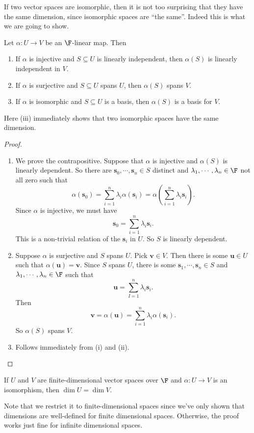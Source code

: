 \documentclass[a4paper]{article}
\begin{document}
If two vector spaces are isomorphic, then it is not too surprising that they have the same dimension, since isomorphic spaces are ``the same''. Indeed this is what we are going to show.
\begin{prop}
  Let $\alpha: U\to V$ be an $\F$-linear map. Then
  \begin{enumerate}
    \item If $\alpha$ is injective and $S\subseteq U$ is linearly independent, then $\alpha (S)$ is linearly independent in $V$.
    \item If $\alpha$ is surjective and $S\subseteq U$ spans $U$, then $\alpha (S)$ spans $V$.
    \item If $\alpha$ is isomorphic and $S\subseteq U$ is a basis, then $\alpha(S)$ is a basis for $V$.
  \end{enumerate}
\end{prop}
Here (iii) immediately shows that two isomorphic spaces have the same dimension.
\begin{proof}\leavevmode
  \begin{enumerate}
    \item We prove the contrapositive. Suppose that $\alpha$ is injective and $\alpha(S)$ is linearly dependent. So there are $\mathbf{s}_0, \cdots, \mathbf{s}_n \in S$ distinct and $\lambda_1, \cdots, \lambda_n\in \F$ not all zero such that
      \[
        \alpha(\mathbf{s}_0) = \sum_{i = 1}^n \lambda_i \alpha(\mathbf{s}_i) = \alpha\left(\sum_{i = 1}^n \lambda_i \mathbf{s}_i\right).
      \]
      Since $\alpha$ is injective, we must have
      \[
        \mathbf{s}_0 = \sum_{i = 1}^n \lambda_i \mathbf{s}_i.
      \]
      This is a non-trivial relation of the $\mathbf{s}_i$ in $U$. So $S$ is linearly dependent.
    \item Suppose $\alpha$ is surjective and $S$ spans $U$. Pick $\mathbf{v} \in V$. Then there is some $\mathbf{u}\in U$ such that $\alpha(\mathbf{u}) = \mathbf{v}$. Since $S$ spans $U$, there is some $\mathbf{s}_1, \cdots, \mathbf{s}_n\in S$ and $\lambda_1, \cdots, \lambda_n\in \F$ such that
      \[
        \mathbf{u} = \sum_{I = 1}^n \lambda_i \mathbf{s}_i.
      \]
      Then
      \[
        \mathbf{v} = \alpha (\mathbf{u}) = \sum_{i = 1}^n \lambda_i \alpha (\mathbf{s}_i).
      \]
      So $\alpha (S)$ spans $V$.
    \item Follows immediately from (i) and (ii).
  \end{enumerate}
\end{proof}

\begin{cor}
  If $U$ and $V$ are finite-dimensional vector spaces over $\F$ and $\alpha: U\to V$ is an isomorphism, then $\dim U = \dim V$.
\end{cor}
Note that we restrict it to finite-dimensional spaces since we've only shown that dimensions are well-defined for finite dimensional spaces. Otherwise, the proof works just fine for infinite dimensional spaces.
\end{document}
